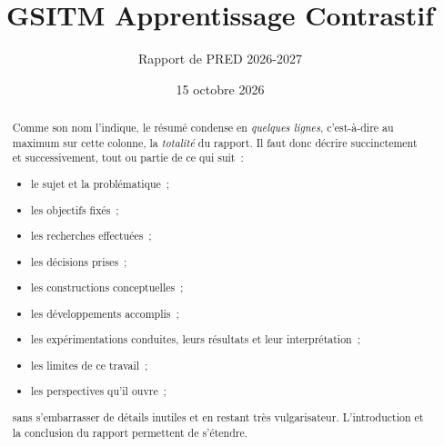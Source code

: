 \documentclass[11pt, french, screen, research-development]{report-rd-info}
\newenvironment{textClassique}
{\color{black}
 \begin{list}{}{\hspace{0.2\textwidth}\color{black}}\item
}
{\end{list}}
\begin{document}
\title{GSITM Apprentissage Contrastif}
\subtitle{Rapport de PRED 2026-2027}
\date{15 octobre 2026}


\begin{abstract}
\small

\begin{textClassique}
   Comme son nom l'indique, le résumé condense en \emph{quelques lignes}, c'est-à-dire au maximum sur cette colonne, la \emph{totalité} du rapport.
   Il faut donc décrire succinctement et successivement, tout ou partie de ce qui suit~:
   \begin{itemize}
      \item le sujet et la problématique~;
      \item les objectifs fixés~;
      \item les recherches effectuées~;
      \item les décisions prises~;
      \item les constructions conceptuelles~;
      \item les développements accomplis~;
      \item les expérimentations conduites, leurs résultats et leur interprétation~;
      \item les limites de ce travail~;
      \item les perspectives qu'il ouvre~;
   \end{itemize}
   sans s'embarrasser de détails inutiles et en restant très vulgarisateur.
   L'introduction et la conclusion du rapport permettent de s'étendre.
\end{textClassique}
\end{abstract}
\end{document}
